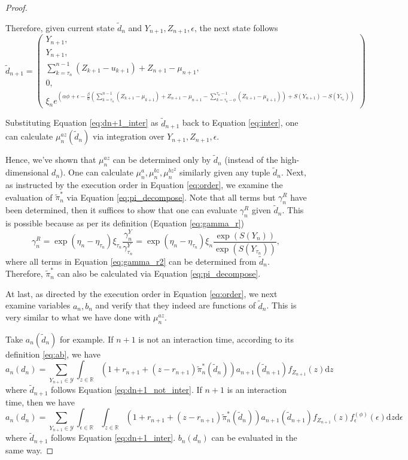 \begin{proof}
\begin{enumerate}
    Therefore, given current state $\tilde d_n$ and $Y_{n+1}, Z_{n+1}, \epsilon$, the next state follows \begin{equation}
    \label{eq:dn+1_inter}
        \tilde d_{n+1}=\begin{pmatrix}Y_{n+1},\\
        Y_{n+1},\\
        \sum_{k=\tau_n}^{n-1}(Z_{k+1}-u_{k+1})+Z_{n+1}-\mu_{n+1},\\
        0,\\
        \xi_{n}e^{\left(\alpha\phi+\epsilon-\frac{\beta}{\phi}\left(\sum_{k=\tau_n}^{n-1}(Z_{k+1}-\mu_{k+1})+Z_{n+1}-\mu_{n+1}-\sum_{k=\tau_n-\phi}^{\tau_n-1}(Z_{k+1}-\mu_{k+1})\right)+S(Y_{n+1})-S(Y_{\tau_n})\right)}
    \end{pmatrix}
    \end{equation}
    
    Substituting Equation \eqref{eq:dn+1_inter} as $\tilde d_{n+1}$ back to Equation \eqref{eq:inter}, one can calculate $\mu_{n}^{az}(\tilde d_n)$ via integration over $Y_{n+1},Z_{n+1},\epsilon$.
\end{enumerate}

Hence, we've shown that $\mu_n^{az}$ can be determined only by $\tilde d_n$ (instead of the high-dimensional $d_n$). One can calculate $\mu_n^a,\mu_n^{bz},\mu_n^{bz^2}$ similarly given any tuple $\tilde d_n$. Next, as instructed by the execution order in Equation \eqref{eq:order}, we examine the evaluation of $\tilde\pi_n^*$ via Equation \eqref{eq:pi_decompose}. Note that all terms but $\gamma_n^R$ have been determined, then it suffices to show that one can evaluate $\gamma_n^R$ given $\tilde d_n$. This is possible because as per its definition (Equation \eqref{eq:gamma_r})\begin{equation}\label{eq:gamma_r2}
    \gamma_n^R=\exp(\eta_n-\eta_{\tau_n})\xi_{\tau_n}\frac{\gamma_n^Y}{\gamma_{\tau_n}^Y}=\exp(\eta_n-\eta_{\tau_n})\xi_n\frac{\exp(S(Y_n))}{\exp(S(Y_{\tau_n}))},
\end{equation} where all terms in Equation \eqref{eq:gamma_r2} can be determined from $\tilde d_n$. Therefore, $\tilde\pi_n^*$ can also be calculated via Equation \eqref{eq:pi_decompose}.

At last, as directed by the execution order in Equation \eqref{eq:order}, we next examine variables $a_n,b_n$ and verify that they indeed are functions of $\tilde d_n$. This is very similar to what we have done with $\mu_n^{az}$.

Take $a_n(\tilde d_n)$ for example. If $n+1$ is not an interaction time, according to its definition \eqref{eq:ab}, we have $$
a_n(d_n)=\sum_{Y_{n+1}\in\mathcal Y}\int_{z\in\mathbb R} (1+r_{n+1}+(z-r_{n+1})\tilde\pi^*_n(\tilde d_n))a_{n+1}(\tilde d_{n+1}) f_{Z_{n+1}}(z)\mathrm dz
$$ where $\tilde d_{n+1}$ follows Equation \eqref{eq:dn+1_not_inter}. If $n+1$ is an interaction time, then we have $$
a_n(d_n)=\sum_{Y_{n+1}\in\mathcal Y}\int_{\epsilon\in\mathbb R}\int_{z\in\mathbb R} (1+r_{n+1}+(z-r_{n+1})\tilde\pi^*_n(\tilde d_n))a_{n+1}(\tilde d_{n+1}) f_{Z_{n+1}}(z) f_\epsilon^{(\phi)}(\epsilon)\mathrm dz\mathrm d\epsilon
$$ where $\tilde d_{n+1}$ follows Equation \eqref{eq:dn+1_inter}. $b_n(d_n)$ can be evaluated in the same way.


\end{proof}
